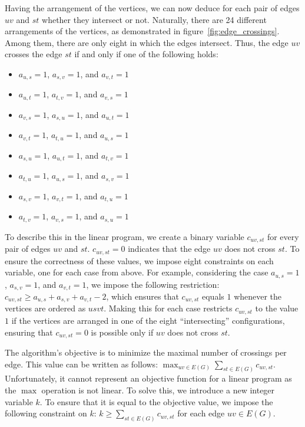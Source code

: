 Having the arrangement of the vertices, we can now deduce for each pair of edges $uv$ and $st$ whether they intersect or not.
Naturally, there are 24 different arrangements of the vertices, as demonstrated in figure~\ref{fig:edge_crossings}.
Among them, there are only eight in which the edges intersect.
Thus, the edge $uv$ crosses the edge $st$ if and only if one of the following holds:
\begin{itemize}[noitemsep]
    \item $a_{u,s} = 1$, $a_{s,v} = 1$, and $a_{v,t} = 1$
    \item $a_{u,t} = 1$, $a_{t,v} = 1$, and $a_{v,s} = 1$
    \item $a_{v,s} = 1$, $a_{s,u} = 1$, and $a_{u,t} = 1$
    \item $a_{v,t} = 1$, $a_{t,u} = 1$, and $a_{u,s} = 1$
    \item $a_{s,u} = 1$, $a_{u,t} = 1$, and $a_{t,v} = 1$
    \item $a_{t,u} = 1$, $a_{u,s} = 1$, and $a_{s,v} = 1$
    \item $a_{s,v} = 1$, $a_{v,t} = 1$, and $a_{t,u} = 1$
    \item $a_{t,v} = 1$, $a_{v,s} = 1$, and $a_{s,u} = 1$
\end{itemize}

To describe this in the linear program, we create a binary variable $c_{uv, st}$ for every pair of edges $uv$ and $st$.
$c_{uv, st} = 0$ indicates that the edge $uv$ does not cross $st$.
To ensure the correctness of these values, we impose eight constraints on each variable, one for each case from above.
For example, considering the case $a_{u,s} = 1$, $a_{s,v} = 1$, and $a_{v,t} = 1$, we impose the following restriction: $c_{uv, st} \geqslant a_{u,s} + a_{s,v} + a_{v,t} - 2$, which ensures that $c_{uv, st}$ equals $1$ whenever the vertices are ordered as $usvt$.
Making this for each case restricts $c_{uv, st}$ to the value $1$ if the vertices are arranged in one of the eight ``intersecting'' configurations, ensuring that $c_{uv, st} = 0$ is possible only if $uv$ does not cross $st$.

The algorithm's objective is to minimize the maximal number of crossings per edge.
This value can be written as follows: $\max_{uv \in E(G)} \sum_{st \in E(G)} c_{uv, st}$.
Unfortunately, it cannot represent an objective function for a linear program as the $\max$ operation is not linear.
To solve this, we introduce a new integer variable $k$.
To ensure that it is equal to the objective value, we impose the following constraint on $k$: $k \geqslant \sum_{st \in E(G)} c_{uv, st}$ for each edge $uv \in E(G)$.

